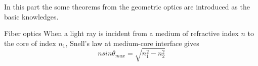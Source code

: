 In this part the  some theorems from the geometric optics  are introduced as the basic knowledges.

Fiber optics
When a light ray is incident from a medium of refractive index $n$ to the core of index $n_{1}$, Snell's law at medium-core interface gives
\begin{equation}
nsin\theta_{max}=\sqrt{n_{1}^2-n_{2}^2}
\label{snell}
\end{equation}